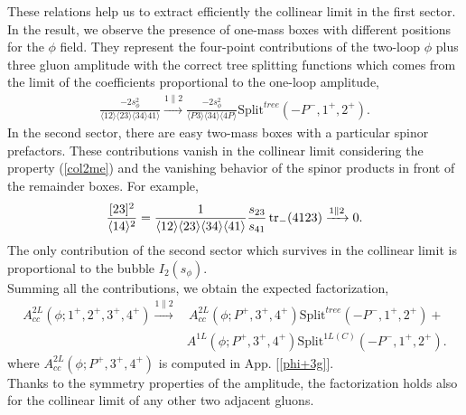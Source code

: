 These relations help us to extract efficiently the collinear limit in the first sector. In the result, we observe the presence of one-mass boxes with different positions for the $\phi$ field. They represent the four-point contributions of the two-loop $\phi$ plus three gluon amplitude with the correct tree splitting functions which comes from the limit of the coefficients proportional to the one-loop amplitude,
\begin{align*}
	\frac{-2 s_\phi^2}{\langle 12 \rangle \langle 23 \rangle \langle 34 \rangle 41 \rangle}  \xrightarrow[]{1 \parallel 2} \frac{-2 s_\phi^2}{\langle P3 \rangle \langle 34 \rangle \langle 4P \rangle} \text{Split}^{tree}(-P^-,1^+,2^+).
\end{align*}
In the second sector, there are easy two-mass boxes with a particular spinor prefactors. These contributions vanish in the collinear limit considering the property (\ref{col2me}) and the vanishing behavior of the spinor products in front of the remainder boxes. For example,
\begin{align*}
	\frac{[23]^2}{\langle 14 \rangle^2}=\frac{1}{\langle 12 \rangle \langle 23 \rangle \langle 34 \rangle \langle 41 \rangle}\frac{s_{23}}{s_{41}}\tr_-(4123) \xrightarrow[]{1 \parallel 2}  0.
\end{align*} 
The only contribution of the second sector which survives in the collinear limit is proportional to the bubble $I_2(s_\phi)$.\\
Summing all the contributions, we obtain the expected factorization,
\begin{align*}
	A^{2L}_{cc}(\phi;1^+,2^+,3^+,4^+)  \xrightarrow[]{1 \parallel 2} &\,A^{2L}_{cc}(\phi;P^+,3^+,4^+) \text{Split}^{tree}(-P^-,1^+,2^+)+\\
	&A^{1L}(\phi;P^+,3^+,4^+)\text{Split}^{1L(C)}(-P^-,1^+,2^+).
\end{align*}
where $A^{2L}_{cc}(\phi;P^+,3^+,4^+)$ is computed in App. [\ref{phi+3g}].\\
Thanks to the symmetry properties of the amplitude, the factorization holds also for the collinear limit of any other two adjacent gluons.
\iffalse
